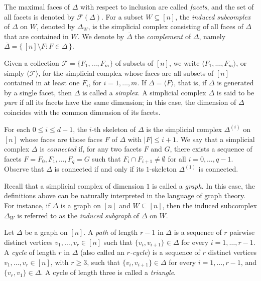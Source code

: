 \documentclass[12pt]{amsart}
\begin{document}
The maximal faces of $\Delta$ with respect to inclusion are called \textit{facets}, and the set of all facets is denoted by $\mathcal{F}(\Delta)$. For a subset $W \subseteq [n]$, the \textit{induced subcomplex} of $\Delta$ on $W$, denoted by $\Delta_W$, is the simplicial complex consisting of all faces of $\Delta$ that are contained in $W$. We denote by $\overline{\Delta}$ the \textit{complement} of $\Delta$, namely $\overline{\Delta} = \{\, [n] \setminus F : F \in \Delta \,\}$.

Given a collection $\mathcal{F} = \{F_1, \dots, F_m\}$ of subsets of $[n]$, we write $\langle F_1, \dots, F_m \rangle$, or simply $\langle \mathcal{F} \rangle$, for the simplicial complex whose faces are all subsets of $[n]$ contained in at least one $F_i$, for $i = 1,\dots,m$. If $\Delta = \langle F\rangle$, that is, if $\Delta$ is generated by a single facet, then $\Delta$ is called a \textit{simplex}. A simplicial complex $\Delta$ is said to be \textit{pure} if all its facets have the same dimension; in this case, the dimension of $\Delta$ coincides with the common dimension of its facets.

For each $0 \le i \le d-1$, the $i$-th skeleton of $\Delta$ is the simplicial complex $\Delta^{(i)}$ on $[n]$ whose faces are those faces $F$ of $\Delta$ with $|F| \le i+1$. We say that a simplicial complex $\Delta$ is \emph{connected} if, for any two facets $F$ and $G$, there exists a sequence of facets $F = F_0, F_1, \dots, F_q = G$ such that $F_i \cap F_{i+1} \neq \emptyset$ for all $i=0,\dots,q-1$. Observe that $\Delta$ is connected if and only if its $1$-skeleton $\Delta^{(1)}$ is connected.

Recall that a simplicial complex of dimension $1$ is called a \textit{graph}. In this case, the definitions above can be naturally interpreted in the language of graph theory. For instance, if $\Delta$ is a graph on $[n]$ and $W \subseteq [n]$, then the induced subcomplex $\Delta_W$ is referred to as the \textit{induced subgraph} of $\Delta$ on $W$.

Let $\Delta$ be a graph on $[n]$. A \textit{path} of length $r-1$ in $\Delta$ is a sequence of $r$ pairwise distinct vertices $v_1, \ldots, v_r \in [n]$ such that $\{v_i, v_{i+1}\} \in \Delta$ for every $i = 1, \ldots, r-1$. A \textit{cycle} of length $r$ in $\Delta$ (also called an \textit{$r$-cycle}) is a sequence of $r$ distinct vertices $v_1, \ldots, v_r \in [n]$, with $r \ge 3$, such that $\{v_i, v_{i+1}\} \in \Delta$ for every $i = 1, \ldots, r-1$, and $\{v_r, v_1\} \in \Delta$. A cycle of length three is called a \textit{triangle}.
\end{document}

